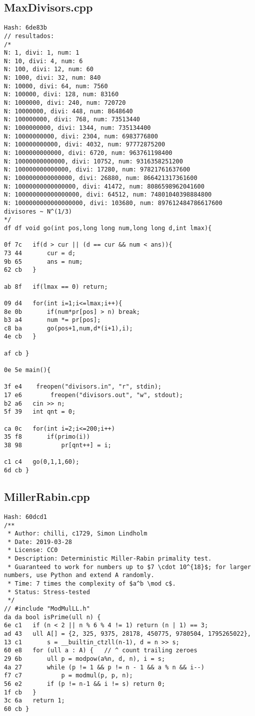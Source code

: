 \documentclass[11pt, a4paper, twoside]{article}
\begin{document}
\subsection{MaxDivisors.cpp}
\begin{lstlisting}
Hash: 6de83b
// resultados: 
/*
N: 1, divi: 1, num: 1
N: 10, divi: 4, num: 6
N: 100, divi: 12, num: 60
N: 1000, divi: 32, num: 840
N: 10000, divi: 64, num: 7560
N: 100000, divi: 128, num: 83160
N: 1000000, divi: 240, num: 720720
N: 10000000, divi: 448, num: 8648640
N: 100000000, divi: 768, num: 73513440
N: 1000000000, divi: 1344, num: 735134400
N: 10000000000, divi: 2304, num: 6983776800
N: 100000000000, divi: 4032, num: 97772875200
N: 1000000000000, divi: 6720, num: 963761198400
N: 10000000000000, divi: 10752, num: 9316358251200
N: 100000000000000, divi: 17280, num: 97821761637600
N: 1000000000000000, divi: 26880, num: 866421317361600
N: 10000000000000000, divi: 41472, num: 8086598962041600
N: 100000000000000000, divi: 64512, num: 74801040398884800
N: 1000000000000000000, divi: 103680, num: 897612484786617600
divisores ~ N^(1/3)
*/
df df void go(int pos,long long num,long long d,int lmax){
      	
0f 7c 	if(d > cur || (d == cur && num < ans)){
73 44 		cur = d;
9b 65 		ans = num;
62 cb 	}
      	
ab 8f 	if(lmax == 0) return;
      	
09 d4 	for(int i=1;i<=lmax;i++){
8e 0b 		if(num*pr[pos] > n) break;
b3 a4 		num *= pr[pos];
c8 ba 		go(pos+1,num,d*(i+1),i);
4e cb 	}
       
af cb }
 
0e 5e main(){
      	
3f e4 	 freopen("divisors.in", "r", stdin);
17 e6    	 freopen("divisors.out", "w", stdout);
b2 a6 	cin >> n;
5f 39 	int qnt = 0;
      	
ca 0c 	for(int i=2;i<=200;i++)
35 f8 		if(primo(i))
38 98 			pr[qnt++] = i;
      		
c1 c4 	go(0,1,1,60);
6d cb }
\end{lstlisting}

\subsection{MillerRabin.cpp}
\begin{lstlisting}
Hash: 60dcd1
/**
 * Author: chilli, c1729, Simon Lindholm
 * Date: 2019-03-28
 * License: CC0
 * Description: Deterministic Miller-Rabin primality test.
 * Guaranteed to work for numbers up to $7 \cdot 10^{18}$; for larger numbers, use Python and extend A randomly.
 * Time: 7 times the complexity of $a^b \mod c$.
 * Status: Stress-tested
 */
// #include "ModMulLL.h"
da da bool isPrime(ull n) {
6e c1 	if (n < 2 || n % 6 % 4 != 1) return (n | 1) == 3;
ad 43 	ull A[] = {2, 325, 9375, 28178, 450775, 9780504, 1795265022},
13 c1 	    s = __builtin_ctzll(n-1), d = n >> s;
60 e8 	for (ull a : A) {   // ^ count trailing zeroes
29 6b 		ull p = modpow(a%n, d, n), i = s;
4a 27 		while (p != 1 && p != n - 1 && a % n && i--)
f7 c7 			p = modmul(p, p, n);
56 e2 		if (p != n-1 && i != s) return 0;
1f cb 	}
3c 6a 	return 1;
60 cb }
\end{lstlisting}
\end{document}
